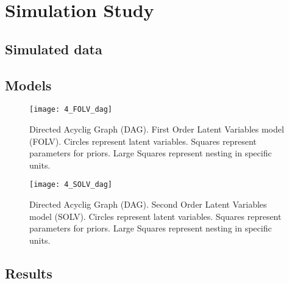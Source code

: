 \chapter{Simulation Study} \label{chap:simulation}

\section{Simulated data}

\section{Models}
%
\begin{figure}[h]
	\centering
	\texttt{[image: 4\_FOLV\_dag]}
	\caption[Directed Acyclig Graph (DAG). First Order Latent Variables model (FOLV).]%
	{Directed Acyclig Graph (DAG). First Order Latent Variables model (FOLV). Circles represent latent variables. Squares represent parameters for priors. Large Squares represent nesting in specific units.}
	\label{fig:FOLV_model}
\end{figure}

%
\begin{figure}[h]
	\centering
	\texttt{[image: 4\_SOLV\_dag]}
	\caption[Directed Acyclig Graph (DAG). Second Order Latent Variables model (SOLV).]%
	{Directed Acyclig Graph (DAG). Second Order Latent Variables model (SOLV). Circles represent latent variables. Squares represent parameters for priors. Large Squares represent nesting in specific units.}
	\label{fig:SOLV_model}
\end{figure}


\section{Results}


